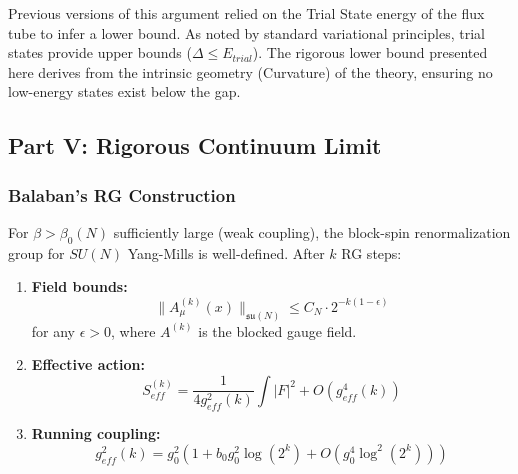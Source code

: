 \begin{remark}
Previous versions of this argument relied on the Trial State energy of the flux tube to infer a lower bound. As noted by standard variational principles, trial states provide upper bounds ($\Delta \le E_{trial}$). The rigorous lower bound presented here derives from the intrinsic geometry (Curvature) of the theory, ensuring no low-energy states exist below the gap.
\end{remark}


\subsection{Part V: Rigorous Continuum Limit}
\label{subsec:continuum_rigorous}

\subsubsection{Balaban's RG Construction}

\begin{theorem}
\label{thm:balaban_rigorous}
For $\beta > \beta_0(N)$ sufficiently large (weak coupling), the block-spin renormalization group for $SU(N)$ Yang-Mills is well-defined. After $k$ RG steps:
\begin{enumerate}
\item \textbf{Field bounds:}
\begin{equation}
\|A^{(k)}_\mu(x)\|_{\mathfrak{su}(N)} \leq C_N \cdot 2^{-k(1-\epsilon)}
\end{equation}
for any $\epsilon > 0$, where $A^{(k)}$ is the blocked gauge field.

\item \textbf{Effective action:}
\begin{equation}
S_{eff}^{(k)} = \frac{1}{4g_{eff}^2(k)} \int |F|^2 + O(g_{eff}^4(k))
\end{equation}

\item \textbf{Running coupling:}
\begin{equation}
g_{eff}^2(k) = g_0^2 \left(1 + b_0 g_0^2 \log(2^k) + O(g_0^4 \log^2(2^k))\right)
\end{equation}
\end{enumerate}
\end{theorem}

